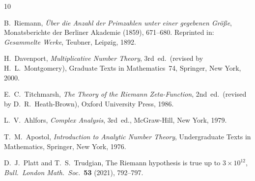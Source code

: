 \documentclass[12pt,a4paper]{amsart}
\theoremstyle{definition}
\begin{document}
\begin{thebibliography}{10}

B.~Riemann,
\emph{\"Uber die Anzahl der Primzahlen unter einer gegebenen Gr\"o\ss e},
Monatsberichte der Berliner Akademie (1859), 671--680.
Reprinted in: \emph{Gesammelte Werke}, Teubner, Leipzig, 1892.

H.~Davenport,
\emph{Multiplicative Number Theory}, 3rd~ed.\
(revised by H.~L.~Montgomery),
Graduate Texts in Mathematics~74,
Springer, New York, 2000.

E.~C.~Titchmarsh,
\emph{The Theory of the Riemann Zeta-Function}, 2nd~ed.\
(revised by D.~R.~Heath-Brown),
Oxford University Press, 1986.

L.~V.~Ahlfors,
\emph{Complex Analysis}, 3rd~ed.,
McGraw-Hill, New York, 1979.

T.~M.~Apostol,
\emph{Introduction to Analytic Number Theory},
Undergraduate Texts in Mathematics,
Springer, New York, 1976.

D.~J.~Platt and T.~S.~Trudgian,
The Riemann hypothesis is true up to $3 \times 10^{12}$,
\emph{Bull.\ London Math.\ Soc.}\ \textbf{53} (2021), 792--797.

\end{thebibliography}
\end{document}
